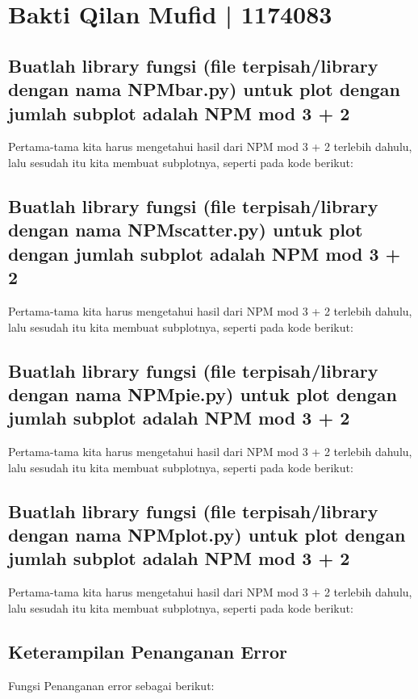 \section{Bakti Qilan Mufid | 1174083}
\subsection{Buatlah library fungsi (file terpisah/library dengan nama NPM\textunderscore bar.py) untuk plot dengan jumlah subplot adalah NPM mod 3 + 2}
\hfill \break
Pertama-tama kita harus mengetahui hasil dari NPM mod 3 + 2 terlebih dahulu, lalu sesudah itu kita membuat subplotnya, seperti pada kode berikut:


\subsection{Buatlah library fungsi (file terpisah/library dengan nama NPM\textunderscore scatter.py) untuk plot dengan jumlah subplot adalah NPM mod 3 + 2}
\hfill \break
Pertama-tama kita harus mengetahui hasil dari NPM mod 3 + 2 terlebih dahulu, lalu sesudah itu kita membuat subplotnya, seperti pada kode berikut:


\subsection{Buatlah library fungsi (file terpisah/library dengan nama NPM\textunderscore pie.py) untuk plot dengan jumlah subplot adalah NPM mod 3 + 2}
\hfill \break
Pertama-tama kita harus mengetahui hasil dari NPM mod 3 + 2 terlebih dahulu, lalu sesudah itu kita membuat subplotnya, seperti pada kode berikut:


\subsection{Buatlah library fungsi (file terpisah/library dengan nama NPM\textunderscore plot.py) untuk plot dengan jumlah subplot adalah NPM mod 3 + 2}
\hfill \break
Pertama-tama kita harus mengetahui hasil dari NPM mod 3 + 2 terlebih dahulu, lalu sesudah itu kita membuat subplotnya, seperti pada kode berikut:


\subsection{Keterampilan Penanganan Error}
Fungsi Penanganan error sebagai berikut:


